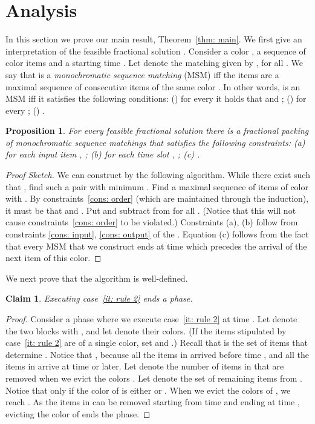 \documentclass[11pt]{article}
\newtheorem{claim}[theorem]{Claim}
\newtheorem{proposition}[theorem]{Proposition}
\newenvironment{proofsketch}{\begin{proof}[Proof Sketch]}{\end{proof}}
\begin{document}
\section{Analysis}

In this section we prove our main result, Theorem~\ref{thm: main}.
We first give an interpretation of the feasible fractional solution .
Consider a color , a sequence  of color  items 
and a starting time . Let  denote the matching given by
, for all .
We say that  is a {\em monochromatic sequence matching} (MSM)
iff the items are a maximal sequence of consecutive items of the same color .
In other words,  is an MSM iff it
satisfies the following conditions:
() for every  it holds that 
and ;
()  for every ;
() .
\begin{proposition}\label{pr: packing sequences}
For every feasible fractional solution  there is a fractional packing
of monochromatic sequence matchings 
that satisfies the following constraints:
(a) for each input item , ;
(b) for each time slot , ;
(c) .
\end{proposition}

\begin{proofsketch}
We can construct  by the following algorithm.
While there exist  such that , find
such a pair with minimum . Find a maximal sequence
 of items of color  with
. By constraints~\eqref{cons: order}
(which are maintained through the induction), it must
be that  and .
Put  and subtract 
from  for all . (Notice that this
will not cause constraints~\eqref{cons: order} to be violated.)
Constraints (a), (b) follow from constraints \eqref{cons: input},
\eqref{cons: output} of the . Equation (c) follows from
the fact that every MSM  that we construct ends at
time  which precedes the arrival of the next item of
this color.
\end{proofsketch}

We next prove that the algorithm is well-defined.
\begin{claim}\label{cl: rule 2}
Executing case~\ref{it: rule 2} ends a phase.
\end{claim}

\begin{proof}
Consider a phase  where we execute case~\ref{it: rule 2}
at time .
Let  denote the two blocks with
, and let  denote their
colors. (If the  items stipulated by
case~\ref{it: rule 2} are of a single color, set
 and .)
Recall that  is the set of items that determine
. Notice that
, because all
the items in  arrived before time ,
and all the items in  arrive at time  or
later. Let  denote the number of items in
 that are removed when we evict the colors
. Let  denote the set of remaining items
from . Notice that  only if the color
of  is either  or . When we evict the
colors of , we reach . As the items
in  can be removed starting from time 
and ending at time , evicting the color of
 ends the phase.
\end{proof}
\end{document}

